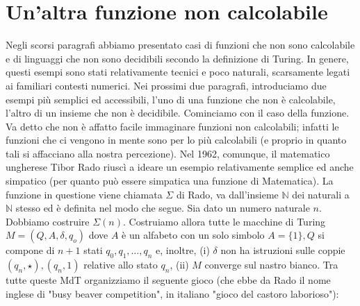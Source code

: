 \section{Un'altra funzione non calcolabile}

Negli scorsi paragrafi
abbiamo presentato casi di funzioni che non sono calcolabile e di linguaggi che
non sono decidibili secondo la definizione di Turing. In genere, questi esempi
sono stati relativamente tecnici e poco naturali, scarsamente legati ai
familiari contesti numerici. Nei prossimi due paragrafi, introduciamo due esempi
più semplici ed accessibili, l'uno di una funzione che non è calcolabile,
l'altro di un insieme che non è decidibile. Cominciamo con il caso della
funzione. Va detto che non è affatto facile immaginare funzioni non calcolabili;
infatti le funzioni che ci vengono in mente sono per lo più calcolabili (e
proprio in quanto tali si affacciano alla nostra percezione). Nel 1962,
comunque, il matematico ungherese Tibor Rado riuscì a ideare un esempio
relativamente semplice ed anche simpatico (per quanto può essere simpatica una
funzione di Matematica). La funzione in questione viene chiamata $\Sigma$ di
Rado, va dall'insieme $\mathbb{N}$ dei naturali a $\mathbb{N}$ stesso ed è
definita nel modo che segue. Sia dato un numero naturale $n$. Dobbiamo costruire
$\Sigma(n)$. Costruiamo allora tutte le macchine di Turing $M=\left(Q, A,
    \delta, q_o\right)$ dove $A$ è un alfabeto con un solo simbolo $A=\{1\}, Q$ si
compone di $n+1$ stati $q_0, q_1, \ldots, q_n$ e, inoltre, (i) $\delta$ non ha
istruzioni sulle coppie $\left(q_n, \star\right),\left(q_n, 1\right)$ relative
allo stato $q_n$, (ii) $M$ converge sul nastro bianco. Tra tutte queste MdT
organizziamo il seguente gioco (che ebbe da Rado il nome inglese di "busy beaver
competition", in italiano "gioco del castoro laborioso"):